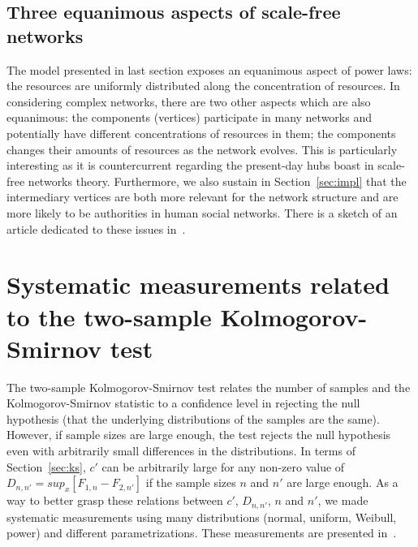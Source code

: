 \begin{apendicesenv}
\subsection{Three equanimous aspects of scale-free networks}
The model presented in last section exposes an equanimous aspect of power laws:
the resources are uniformly distributed along the concentration of resources.
In considering complex networks, there are two other aspects which are also equanimous:
the components (vertices) participate in many networks and potentially have different concentrations
of resources in them; the components changes their amounts of resources as the network evolves.
This is particularly interesting as it is countercurrent regarding the present-day hubs boast
in scale-free networks theory.
Furthermore, we also sustain in Section~\ref{sec:impl} that the intermediary vertices are both more relevant for the
network structure and are more likely to be authorities in human social networks.
There is a sketch of an article dedicated to these issues in~\cite{eqFree}.

\section{Systematic measurements related to the two-sample Kolmogorov-Smirnov test}
The two-sample Kolmogorov-Smirnov test relates the number of samples and the Kolmogorov-Smirnov statistic
to a confidence level in rejecting the null hypothesis (that the underlying distributions of the samples are the same).
However, if sample sizes are large enough, the test rejects the null hypothesis even with arbitrarily small differences
in the distributions.
In terms of Section~\ref{sec:ks}, $c'$ can be arbitrarily large for any non-zero value of
$D_{n,n'}=sup_x[F_{1,n}-F_{2,n'}]$
if the sample sizes $n$ and $n'$ are large enough.
As a way to better grasp these relations between 
$c'$,
$D_{n,n'}$,
$n$ and $n'$, we made systematic measurements using many distributions
(normal, uniform, Weibull, power) and different parametrizations.
These measurements are presented in~\cite{kolmSmir}.


\end{apendicesenv}
